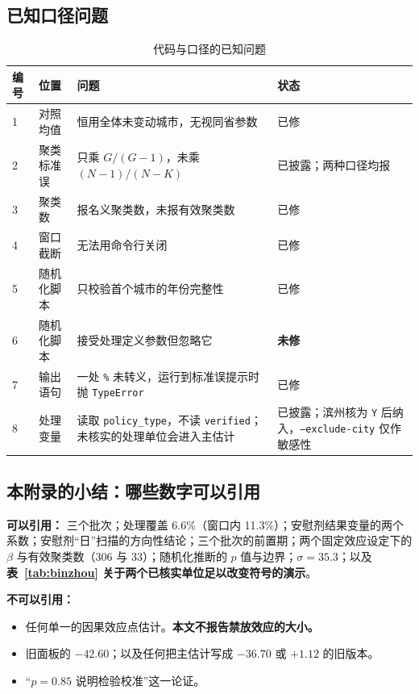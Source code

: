 \subsection{已知口径问题}

\begin{table}[H]
\centering
\caption{代码与口径的已知问题}
\label{tab:code-issues}
\footnotesize
\begin{tabular}{R{0.7cm}L{2.9cm}L{7.7cm}L{3.0cm}}
\toprule
\textbf{编号} & \textbf{位置} & \textbf{问题} & \textbf{状态} \\
 & 对照均值 & 恒用全体未变动城市，无视同省参数 & 已修 \\
2 & 聚类标准误 & 只乘 $G/(G-1)$，未乘 $(N-1)/(N-K)$ & 已披露；两种口径均报 \\
3 & 聚类数 & 报名义聚类数，未报有效聚类数 & 已修 \\
4 & 窗口截断 & 无法用命令行关闭 & 已修 \\
5 & 随机化脚本 & 只校验首个城市的年份完整性 & 已修 \\
6 & 随机化脚本 & 接受处理定义参数但忽略它 & \textbf{未修} \\
7 & 输出语句 & 一处 \texttt{\%} 未转义，运行到标准误提示时抛 \texttt{TypeError} & 已修 \\
8 & 处理变量 & 读取 \texttt{policy\_type}，不读 \texttt{verified}；未核实的处理单位会进入主估计 & 已披露；滨州核为 \texttt{Y} 后纳入，\texttt{--exclude-city} 仅作敏感性 \\
\bottomrule
\end{tabular}
\end{table}

\subsection{本附录的小结：哪些数字可以引用}

\textbf{可以引用：} 三个批次；处理覆盖 6.6\%（窗口内 11.3\%）；安慰剂结果变量的两个系数；安慰剂“日”扫描的方向性结论；三个批次的前置期；两个固定效应设定下的 $\beta$ 与有效聚类数（306 与 33）；随机化推断的 $p$ 值与边界；$\sigma=35.3$；以及\textbf{表~\ref{tab:binzhou} 关于两个已核实单位足以改变符号的演示}。

\textbf{不可以引用：}
\begin{itemize}
  \item 任何单一的因果效应点估计。\textbf{本文不报告禁放效应的大小。}
  \item 旧面板的 $-42.60$；以及任何把主估计写成 $-36.70$ 或 $+1.12$ 的旧版本。
  \item “$p=0.85$ 说明检验校准”这一论证。
\end{itemize}
